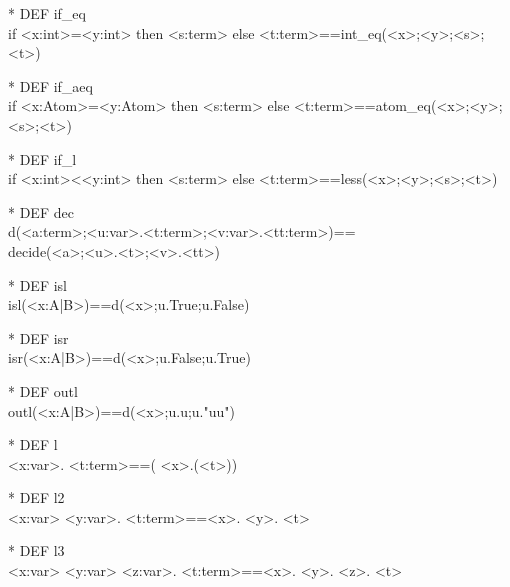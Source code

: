 \begin{prl*}
\>* DEF if\_eq\\
\>  if <x:int>=<y:int> then <s:term> else <t:term>==int\_eq(<x>;<y>;<s>;<t>)
\end{prl*}

\begin{prl*}
\>* DEF if\_aeq\\
\>  if <x:Atom>=<y:Atom> then <s:term> else <t:term>==atom\_eq(<x>;<y>;<s>;<t>)
\end{prl*}

\begin{prl*}
\>* DEF if\_l\\
\>  if <x:int>\mbackslash{}<<y:int> then <s:term> else <t:term>==less(<x>;<y>;<s>;<t>)
\end{prl*}

\begin{prl*}
\>* DEF dec\\
\>  d(<a:term>;<u:var>.<t:term>;<v:var>.<tt:term>)==\\
\>  decide(<a>;<u>.<t>;<v>.<tt>)
\end{prl*}

\begin{prl*}
\>* DEF isl\\
\>  isl(<x:A|B>)==d(<x>;u.True;u.False)
\end{prl*}

\begin{prl*}
\>* DEF isr\\
\>  isr(<x:A|B>)==d(<x>;u.False;u.True)
\end{prl*}

\begin{prl*}
\>* DEF outl\\
\>  outl(<x:A|B>)==d(<x>;u.u;u."uu")
\end{prl*}

\begin{prl*}
\>* DEF l\\
\>  \mlambda{}<x:var>. <t:term>==(\mbackslash{} <x>.(<t>))
\end{prl*}

\begin{prl*}
\>* DEF l2\\
\>  \mlambda{} <x:var> <y:var>. <t:term>==\mlambda{}<x>. \mlambda{}<y>. <t>
\end{prl*}

\begin{prl*}
\>* DEF l3\\
\>  \mlambda{} <x:var> <y:var> <z:var>. <t:term>==\mlambda{}<x>. \mlambda{}<y>. \mlambda{}<z>. <t>
\end{prl*}

